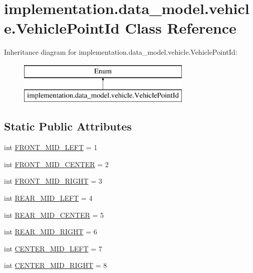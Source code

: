 \hypertarget{classimplementation_1_1data__model_1_1vehicle_1_1_vehicle_point_id}{}\section{implementation.\+data\+\_\+model.\+vehicle.\+Vehicle\+Point\+Id Class Reference}
\label{classimplementation_1_1data__model_1_1vehicle_1_1_vehicle_point_id}
Inheritance diagram for implementation.\+data\+\_\+model.\+vehicle.\+Vehicle\+Point\+Id\+:\begin{figure}[H]
\begin{center}
\leavevmode
\includegraphics[height=2.000000cm]{classimplementation_1_1data__model_1_1vehicle_1_1_vehicle_point_id}
\end{center}
\end{figure}
\subsection*{Static Public Attributes}
\begin{DoxyCompactItemize}
\item 
int \hyperlink{classimplementation_1_1data__model_1_1vehicle_1_1_vehicle_point_id_a943c0b58f0efbac4f9d81c64f2ea67f3}{F\+R\+O\+N\+T\+\_\+\+M\+I\+D\+\_\+\+L\+E\+FT} = 1
\item 
int \hyperlink{classimplementation_1_1data__model_1_1vehicle_1_1_vehicle_point_id_a881e3f176335815cfab95b72dbea5c7d}{F\+R\+O\+N\+T\+\_\+\+M\+I\+D\+\_\+\+C\+E\+N\+T\+ER} = 2
\item 
int \hyperlink{classimplementation_1_1data__model_1_1vehicle_1_1_vehicle_point_id_a00d7b1fee50caea5a5c725b9b6c09ef6}{F\+R\+O\+N\+T\+\_\+\+M\+I\+D\+\_\+\+R\+I\+G\+HT} = 3
\item 
int \hyperlink{classimplementation_1_1data__model_1_1vehicle_1_1_vehicle_point_id_a72b0dc3d4dc689b028c30f509050e971}{R\+E\+A\+R\+\_\+\+M\+I\+D\+\_\+\+L\+E\+FT} = 4
\item 
int \hyperlink{classimplementation_1_1data__model_1_1vehicle_1_1_vehicle_point_id_ad0a7456cc8fe0fba1559c47a3e495aab}{R\+E\+A\+R\+\_\+\+M\+I\+D\+\_\+\+C\+E\+N\+T\+ER} = 5
\item 
int \hyperlink{classimplementation_1_1data__model_1_1vehicle_1_1_vehicle_point_id_ade685b45a86ee874d928d4cba8ee3542}{R\+E\+A\+R\+\_\+\+M\+I\+D\+\_\+\+R\+I\+G\+HT} = 6
\item 
int \hyperlink{classimplementation_1_1data__model_1_1vehicle_1_1_vehicle_point_id_ae281dcb6eeb5d14deaea9721f73b4f07}{C\+E\+N\+T\+E\+R\+\_\+\+M\+I\+D\+\_\+\+L\+E\+FT} = 7
\item 
int \hyperlink{classimplementation_1_1data__model_1_1vehicle_1_1_vehicle_point_id_a8d6cc5e15fe7ad9eda5657edecb2fb21}{C\+E\+N\+T\+E\+R\+\_\+\+M\+I\+D\+\_\+\+R\+I\+G\+HT} = 8
\end{DoxyCompactItemize}


